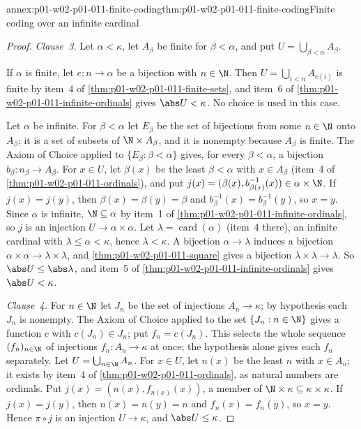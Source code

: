 \begin{annexitem}{annex:p01-w02-p01-011-finite-coding}{thm:p01-w02-p01-011-finite-coding}{Finite coding over an infinite cardinal}
\begin{proof}
\emph{Clause~3.} Let \(\alpha<\kappa\), let \(A_\beta\) be finite for
\(\beta<\alpha\), and put \(U=\bigcup_{\beta<\alpha}A_\beta\).

If \(\alpha\) is finite, let \(e:n\to\alpha\) be a bijection with
\(n\in\N\). Then \(U=\bigcup_{i<n}A_{e(i)}\) is finite by item~4 of
\cref{thm:p01-w02-p01-011-finite-sets}, and item~6 of
\cref{thm:p01-w02-p01-011-infinite-ordinals} gives \(\abs U<\kappa\). No
choice is used in this case.

Let \(\alpha\) be infinite. For \(\beta<\alpha\) let \(E_\beta\) be the set
of bijections from some \(n\in\N\) onto \(A_\beta\); it is a set of subsets
of \(\N\times A_\beta\), and it is nonempty because \(A_\beta\) is finite.
The Axiom of Choice applied to \(\{E_\beta:\beta<\alpha\}\) gives, for every
\(\beta<\alpha\), a bijection \(b_\beta:n_\beta\to A_\beta\). For
\(x\in U\), let \(\beta(x)\) be the least \(\beta<\alpha\) with
\(x\in A_\beta\) (item~4 of \cref{thm:p01-w02-p01-011-ordinals}), and put
\(j(x)=(\beta(x),b_{\beta(x)}^{-1}(x))\in\alpha\times\N\). If
\(j(x)=j(y)\), then \(\beta(x)=\beta(y)=\beta\) and
\(b_\beta^{-1}(x)=b_\beta^{-1}(y)\), so \(x=y\). Since \(\alpha\) is
infinite, \(\N\subseteq\alpha\) by item~1 of
\cref{thm:p01-w02-p01-011-infinite-ordinals}, so \(j\) is an injection
\(U\to\alpha\times\alpha\). Let \(\lambda=\operatorname{card}(\alpha)\) (item~4 there), an
infinite cardinal with \(\lambda\leq\alpha<\kappa\), hence
\(\lambda<\kappa\). A bijection \(\alpha\to\lambda\) induces a bijection
\(\alpha\times\alpha\to\lambda\times\lambda\), and
\cref{thm:p01-w02-p01-011-square} gives a bijection
\(\lambda\times\lambda\to\lambda\). So \(\abs U\leq\abs\lambda\), and item~5
of \cref{thm:p01-w02-p01-011-infinite-ordinals} gives \(\abs U<\kappa\).

\emph{Clause~4.} For \(n\in\N\) let \(J_n\) be the set of injections
\(A_n\to\kappa\); by hypothesis each \(J_n\) is nonempty. The Axiom of
Choice applied to the set \(\{J_n:n\in\N\}\) gives a function \(c\) with
\(c(J_n)\in J_n\); put \(f_n=c(J_n)\). This selects the whole sequence
\((f_n)_{n\in\N}\) of injections \(f_n:A_n\to\kappa\) at once; the hypothesis
alone gives each \(f_n\) separately. Let \(U=\bigcup_{n\in\N}A_n\). For
\(x\in U\), let \(n(x)\) be the least \(n\) with \(x\in A_n\); it exists by
item~4 of \cref{thm:p01-w02-p01-011-ordinals}, as natural numbers are
ordinals. Put \(j(x)=(n(x),f_{n(x)}(x))\), a member of
\(\N\times\kappa\subseteq\kappa\times\kappa\). If \(j(x)=j(y)\), then
\(n(x)=n(y)=n\) and \(f_n(x)=f_n(y)\), so \(x=y\). Hence \(\pi\circ j\) is an
injection \(U\to\kappa\), and \(\abs U\leq\kappa\).
\end{proof}
\end{annexitem}

